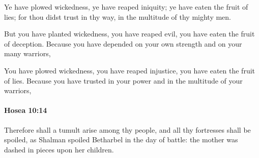 			\begin{versebox}
					\item[BHS] 
					\item[LXX] 
					\item[ASV] Ye have plowed wickedness, ye have reaped iniquity; ye have eaten the fruit of lies; for thou didst trust in thy way, in the multitude of thy mighty men.
					\item[NIV] But you have planted wickedness, you have reaped evil, you have eaten the fruit of deception. Because you have depended on your own strength and on your many warriors,
					\item[NRSV] You have plowed wickedness, you have reaped injustice, you have eaten the fruit of lies. Because you have trusted in your power and in the multitude of your warriors,
			\end{versebox}

		\paragraph{Hosea 10:14} %
			\label{HOSEA-10-14}

			Therefore shall a tumult arise among thy people, and all thy fortresses shall be spoiled, as Shalman spoiled Betharbel in the day of battle: the mother was dashed in pieces upon her children.


